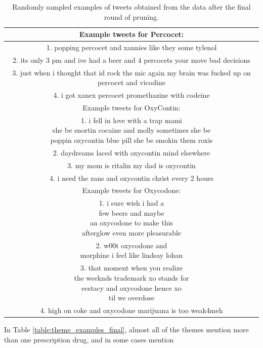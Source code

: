 \begin{table}
\begin{tabular}{|c|}
\hline
Example tweets for Percocet: \\
\hline
1. popping percocet and xannies like they some tylenol \\
2. its only 3 pm and ive had a beer and 4 percocets your move bad decisions \\
3. just when i thought that id rock the mic again my brain was fucked up on percocet and vicodine \\
4. i got xanex percocet promethazine with codeine \\
\hline
Example tweets for OxyContin: \\
\hline
1. \pbox{20cm}{i fell in love with a trap mami \\
            she be snortin cocaine and molly sometimes she be \\poppin oxycontin blue pill she be smokin them roxis} \\
2. daydreams laced with oxycontin mind elsewhere \\
3. my mom is ritalin my dad is oxycontin \\
4. i need the zans and oxycontin christ every 2 hours \\
\hline
Example tweets for Oxycodone: \\
\hline
1. \pbox{20cm}{i sure wish i had a \\few beers and maybe \\an oxycodone to make this \\afterglow even more pleasurable}\\
2. \pbox{20cm}{w00t oxycodone and \\morphine i feel like lindsay lohan}\\
3. \pbox{20cm}{that moment when you realize \\the weeknds trademark xo stands for \\ecstacy and oxycodone hence xo \\til we overdose} \\
4. high on coke and oxycodone marijuana is too weak4meh\\
\hline
\end{tabular}
\caption[Spefic examples of tweets after final round]{Randomly sampled examples of tweets obtained from the data after the final round of pruning.}
\label{table:tweet_examples}
\end{table}
In Table \ref{table:theme_examples_final}, almost all of the 
themes mention more than one prescription drug, and in some cases mention 
